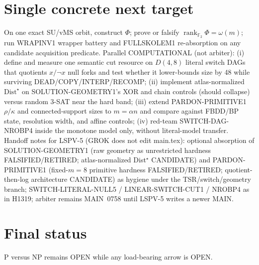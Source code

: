 \documentclass[11pt]{article}
\begin{document}
\section*{Single concrete next target}
On one exact SU/vMS orbit, construct $\Phi$; prove or falsify
$\boxed{\operatorname{rank}_{\mathbb F_2}\Phi=\omega(m)}$;
run WRAPINV1 wrapper battery and FULLSKOLEM1 re-absorption on any candidate acquisition predicate.
Parallel COMPUTATIONAL (not arbiter):
(i) define and measure one semantic cut resource on $D(4,8)$ literal switch DAGs that
quotients $x/\neg x$ null forks and test whether it lower-bounds size by 48 while surviving
DEAD/COPY/INTERP/RECOMP;
(ii) implement atlas-normalized $\mathrm{Dist}^\star$ on SOLUTION-GEOMETRY1's XOR and chain
controls (should collapse) versus random 3-SAT near the hard band;
(iii) extend PARDON-PRIMITIVE1 $\rho/\kappa$ and connected-support sizes to $m=\alpha n$
and compare against FBDD/BP state, resolution width, and affine controls;
(iv) red-team SWITCH-DAG-NROBP4 inside the monotone model only, without literal-model transfer.
Handoff notes for LSPV-5 (GROK does not edit main.tex): optional absorption of
SOLUTION-GEOMETRY1 (raw geometry as unrestricted hardness FALSIFIED/RETIRED;
atlas-normalized Dist$^\star$ CANDIDATE) and PARDON-PRIMITIVE1 (fixed-$m=8$ primitive
hardness FALSIFIED/RETIRED; quotient-then-log architecture CANDIDATE) as hygiene under
the TSR/switch/geometry branch; SWITCH-LITERAL-NULL5 / LINEAR-SWITCH-CUT1 / NROBP4
as in H1319; arbiter remains MAIN~0758 until LSPV-5 writes a newer MAIN.

\section*{Final status}
P versus NP remains OPEN while any load-bearing arrow is OPEN.

\end{document}
